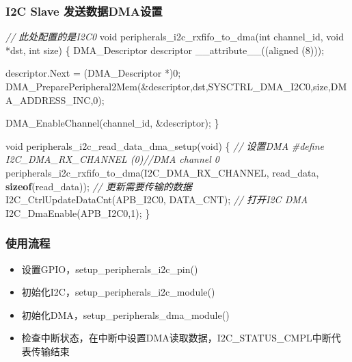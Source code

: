 \documentclass[
  12pt,
]{book}
\newenvironment{Shaded}{\begin{snugshade}}{\end{snugshade}}
\newcommand{\CommentTok}[1]{\textcolor[rgb]{0.56,0.35,0.01}{\textit{#1}}}
\newcommand{\DataTypeTok}[1]{\textcolor[rgb]{0.13,0.29,0.53}{#1}}
\newcommand{\DecValTok}[1]{\textcolor[rgb]{0.00,0.00,0.81}{#1}}
\newcommand{\KeywordTok}[1]{\textcolor[rgb]{0.13,0.29,0.53}{\textbf{#1}}}
\newcommand{\NormalTok}[1]{#1}
\newcommand{\PreprocessorTok}[1]{\textcolor[rgb]{0.56,0.35,0.01}{\textit{#1}}}
\providecommand{\tightlist}{%
  \setlength{\itemsep}{0pt}\setlength{\parskip}{0pt}}
\begin{document}
\hypertarget{i2c-slave-ux53d1ux9001ux6570ux636edmaux8bbeux7f6e-1}{%
\subsubsection{I2C Slave 发送数据DMA设置}\label{i2c-slave-ux53d1ux9001ux6570ux636edmaux8bbeux7f6e-1}}

\begin{Shaded}
\begin{Highlighting}[]
\CommentTok{// 此处配置的是I2C0}
\DataTypeTok{void}\NormalTok{ peripherals_i2c_rxfifo_to_dma(}\DataTypeTok{int}\NormalTok{ channel_id, }\DataTypeTok{void}\NormalTok{ *dst, }\DataTypeTok{int}\NormalTok{ size)}
\NormalTok{\{}
\NormalTok{    DMA_Descriptor descriptor __attribute__((aligned (}\DecValTok{8}\NormalTok{)));}

\NormalTok{    descriptor.Next = (DMA_Descriptor *)}\DecValTok{0}\NormalTok{;}
\NormalTok{    DMA_PreparePeripheral2Mem(&descriptor,dst,SYSCTRL_DMA_I2C0,size,DMA_ADDRESS_INC,}\DecValTok{0}\NormalTok{);}

\NormalTok{    DMA_EnableChannel(channel_id, &descriptor);}
\NormalTok{\}}

\DataTypeTok{void}\NormalTok{ peripherals_i2c_read_data_dma_setup(}\DataTypeTok{void}\NormalTok{)}
\NormalTok{\{}
  \CommentTok{// 设置DMA}
  \PreprocessorTok{#define I2C_DMA_RX_CHANNEL   (0)}\CommentTok{//DMA channel 0}
\NormalTok{  peripherals_i2c_rxfifo_to_dma(I2C_DMA_RX_CHANNEL, read_data, }\KeywordTok{sizeof}\NormalTok{(read_data));}
  \CommentTok{// 更新需要传输的数据}
\NormalTok{  I2C_CtrlUpdateDataCnt(APB_I2C0, DATA_CNT);}
  \CommentTok{// 打开I2C DMA}
\NormalTok{  I2C_DmaEnable(APB_I2C0,}\DecValTok{1}\NormalTok{);}
\NormalTok{\}}
\end{Highlighting}
\end{Shaded}

\hypertarget{ux4f7fux7528ux6d41ux7a0b-7}{%
\subsubsection{使用流程}\label{ux4f7fux7528ux6d41ux7a0b-7}}

\begin{itemize}
\tightlist
\item
  设置GPIO，setup\_peripherals\_i2c\_pin()
\item
  初始化I2C，setup\_peripherals\_i2c\_module()
\item
  初始化DMA，setup\_peripherals\_dma\_module()
\item
  检查中断状态，在中断中设置DMA读取数据，I2C\_STATUS\_CMPL中断代表传输结束
\end{itemize}
\end{document}
